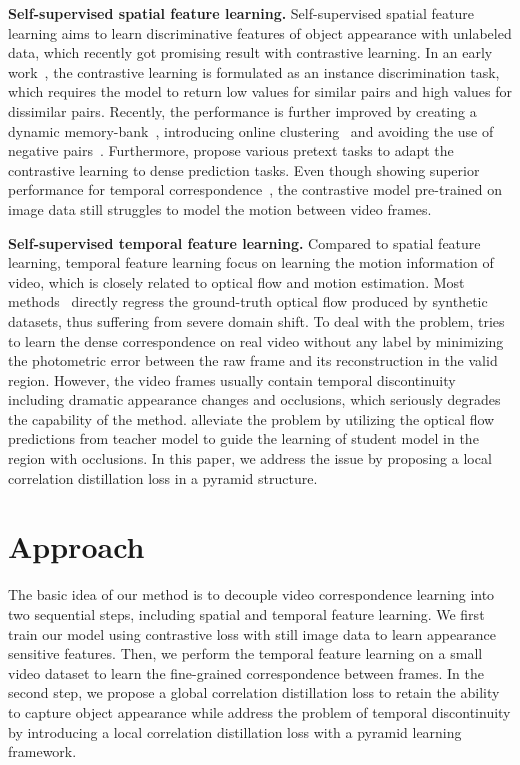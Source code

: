 \documentclass{article}
\begin{document}
\textbf{Self-supervised spatial feature learning.} Self-supervised spatial feature learning aims to learn discriminative features of object appearance with unlabeled data, which recently got promising result with contrastive learning. In an early work~\cite{wu2018unsupervised}, the contrastive learning is formulated as an instance discrimination task, which requires the model to return low values for similar pairs and high values for dissimilar pairs. Recently, the performance is further improved by creating a dynamic memory-bank~\cite{he2020momentum}, introducing online clustering~\cite{caron2020unsupervised} and avoiding the use of negative pairs~\cite{chen2021exploring}\cite{grill2020bootstrap}. Furthermore, \cite{wang2021dense}\cite{xie2021detco}\cite{yang2021instance} propose various pretext tasks to adapt the contrastive learning to dense prediction tasks. Even though showing superior performance for temporal correspondence~\cite{wang2021different}, the contrastive model pre-trained on image data still struggles to model the motion between video frames. 

\textbf{Self-supervised temporal feature learning. } 
Compared to spatial feature learning, temporal feature learning focus on learning the motion information of video, which is closely related to optical flow and motion estimation. Most methods~\cite{dosovitskiy2015flownet}\cite{teed2020raft} directly regress the ground-truth optical flow produced by synthetic datasets, thus suffering from severe domain shift. To deal with the problem, \cite{meister2018unflow} tries to learn the dense correspondence on real video without any label by minimizing the photometric error between the raw frame and its reconstruction in the valid region. However, the video frames usually contain temporal discontinuity including dramatic appearance changes and occlusions, which seriously degrades the capability of the method. \cite{jonschkowski2020matters}\cite{liu2020learning}\cite{liu2019ddflow} alleviate the problem by utilizing the optical flow predictions from teacher model to guide the learning of student model in the region with occlusions. In this paper, we address the issue by proposing a local correlation distillation loss in a pyramid structure.


\section{Approach}
The basic idea of our method is to decouple video correspondence learning into two sequential steps, including spatial and temporal feature learning. We first train our model using contrastive loss with still image data to learn appearance sensitive features. Then, we perform the temporal feature learning on a small video dataset to learn the fine-grained correspondence between frames. In the second step, we propose a global correlation distillation loss to retain the ability to capture object appearance while address the problem of temporal discontinuity by introducing a local correlation distillation loss with a pyramid learning framework.
\end{document}
